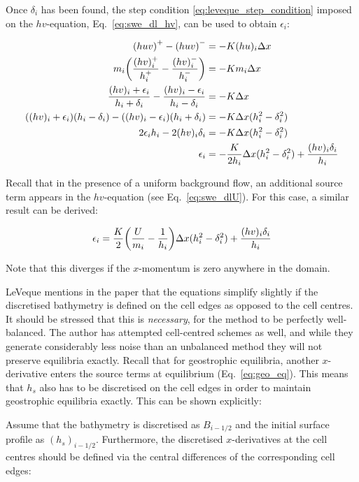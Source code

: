 Once $\delta_i$ has been found, the step condition \ref{eq:leveque_step_condition} imposed on the $hv$-equation, Eq.~\ref{eq:swe_dl_hv}, can be used to obtain $\epsilon_i$:

\begin{align}
  \qty(huv)^+ - \qty(huv)^- &= -K(hu)_i\Delta x \\
  m_i\qty(\frac{(hv)_i^+}{h_i^+} - \frac{(hv)_i^-}{h_i^-}) &= -K m_i \Delta x \\
  \frac{(hv)_i + \epsilon_i}{h_i + \delta_i} - \frac{(hv)_i - \epsilon_i}{h_i - \delta_i} &= -K \Delta x \\
  ((hv)_i+\epsilon_i)(h_i-\delta_i) - ((hv)_i-\epsilon_i)(h_i+\delta_i) &= -K\Delta x (h_i^2 - \delta_i^2) \\
  2\epsilon_i h_i - 2(hv)_i \delta_i &= -K\Delta x (h_i^2 - \delta_i^2) \\
  \epsilon_i &= -\frac{K}{2h_i} \Delta x(h_i^2 - \delta_i^2) + \frac{(hv)_i \delta_i}{h_i}
\end{align}

Recall that in the presence of a uniform background flow, an additional source term appears in the $hv$-equation (see Eq.~\ref{eq:swe_dlU}). For this case, a similar result can be derived:

\begin{equation}
  \epsilon_i = \frac{K}{2} \qty(\frac{U}{m_i} - \frac{1}{h_i}) \Delta x(h_i^2 - \delta_i^2) + \frac{(hv)_i \delta_i}{h_i}
\end{equation}

Note that this diverges if the $x$-momentum is zero anywhere in the domain.

LeVeque mentions in the paper that the equations simplify slightly if the discretised bathymetry is defined on the cell edges as opposed to the cell centres. It should be stressed that this is \emph{necessary}, for the method to be perfectly well-balanced. The author has attempted cell-centred schemes as well, and while they generate considerably less noise than an unbalanced method they will not preserve equilibria exactly. Recall that for geostrophic equilibria, another $x$-derivative enters the source terms at equilibrium (Eq.~\ref{eq:geo_eq}). This means that $h_s$ also has to be discretised on the cell edges in order to maintain geostrophic equilibria exactly. This can be shown explicitly:

Assume that the bathymetry is discretised as $B_{i-1/2}$ and the initial surface profile as $(h_s)_{i-1/2}$. Furthermore, the discretised $x$-derivatives at the cell centres should be defined via the central differences of the corresponding cell edges:

